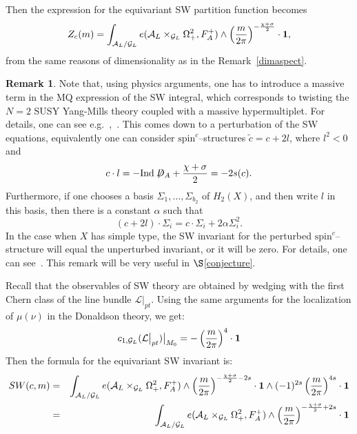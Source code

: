 \documentclass[a4paper,12pt,reqno,sumlimits]{amsart}
\theoremstyle{plain}
\theoremstyle{definition}
\newtheorem{rem}[thm]{Remark}
\newcommand{\1}{{\bf 1}}
\newcommand{\calA}{{\mathcal A}}
\newcommand{\calG}{{\mathcal G}}
\newcommand{\calL}{{\mathcal L}}
\newcommand{\spinc}{$\text{spin}^c$}
\newcommand{\Dirac}{\not\!\!D}
\newcommand{\Ind}{{\operatorname{Ind}}}
\numberwithin{equation}{section}
\begin{document}
Then the expression for the equivariant SW partition function becomes
\begin{equation}
  \label{swabloc}
  Z_c(m)=\int_{\calA_L/\calG_L} e(\calA_L\times_{\calG_L}\Omega^2_+,F_A^+)
  \wedge\left(\frac{m}{2\pi}\right)^{-\frac{\chi+\sigma}{2}}\cdot\1 ,
\end{equation}
from the same reasons of dimensionality as in the Remark~\ref{dimaspect}.  
\begin{rem}
  \label{swrem}
  Note that, using physics arguments, one has to introduce a massive term in
  the MQ expression of the SW integral, which corresponds to twisting the
  $N=2$ SUSY Yang-Mills theory coupled with a massive hypermultiplet. For
  details, one can see e.g.~\cite{park},~\cite{ewmono}.  This comes down to a
  perturbation of the SW equations, equivalently one can consider
  \spinc--structures $\tilde{c}=c+2l$, where $l^2<0$ and
  $$
  c\cdot l = -\Ind\Dirac_A+\frac{\chi+\sigma}{2}=-2s(c).
  $$
  Furthermore, if one chooses a basis $\Sigma_1,\dots,\Sigma_{b_2}$ of
  $H_2(X)$, and then write $l$ in this basis, then there is a constant
  $\alpha$ such that
  $$
  (c+2l)\cdot\Sigma_i = c\cdot\Sigma_i + 2\alpha\Sigma_i^2.
  $$
  In the case when $X$ has simple type, the SW invariant for the perturbed
  \spinc--structure will equal the unperturbed invariant, or it will be zero.
  For details, one can see~\cite{szabo1}.  This remark will be very useful in
  $\S$\ref{conjecture}.
\end{rem}
Recall that the observables of SW theory are obtained by wedging with the
first Chern class of the line bundle $\calL\big|_{pt}$. Using the same
arguments for the localization of $\mu(\nu)$ in the Donaldson theory, we get:
\begin{equation}
  \label{swobsres}
  c_{1,\calG_L}(\calL\big|_{pt})\big|_{M_0}=-\left(\frac{m}{2\pi}\right)^4\cdot\1
\end{equation}
Then the formula for the equivariant SW invariant is:
\begin{eqnarray}
  \label{swobs1}
  SW(c,m)&=&\int_{\calA_L/\calG_L} e(\calA_L\times_{\calG_L}\Omega^2_+,F_A^+)
  \wedge\left(\frac{m}{2\pi}\right)^{-\frac{\chi+\sigma}{2}-2s}\cdot\1
  \wedge (-1)^{2s}\left(\frac{m}{2\pi}\right)^{4s}\cdot\1\nonumber\\
  &=& \int_{\calA_L/\calG_L} e(\calA_L\times_{\calG_L}\Omega^2_+,F_A^+)
  \wedge\left(\frac{m}{2\pi}\right)^{-\frac{\chi+\sigma}{2}+2s}\cdot\1\nonumber\\
  \,
\end{eqnarray}
\end{document}
